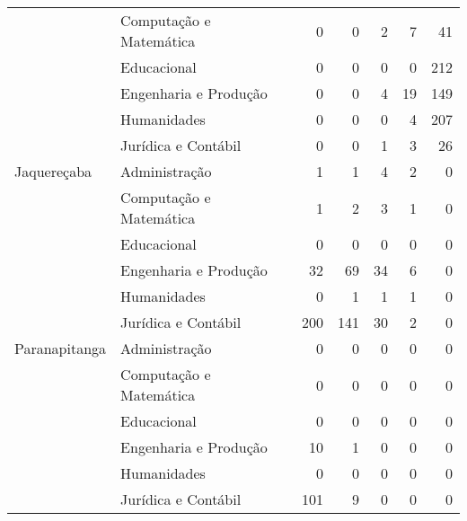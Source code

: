 \begin{table}[ht]
\begin{tabular}{ll rrrrr}
                & Computação e Matemática &                  0 &            0 &           2 &          7 &               41 \\ 
                & Educacional             &                  0 &            0 &           0 &          0 &              212 \\ 
                & Engenharia e Produção   &                  0 &            0 &           4 &         19 &              149 \\ 
                & Humanidades             &                  0 &            0 &           0 &          4 &              207 \\ 
                & Jurídica e Contábil     &                  0 &            0 &           1 &          3 &               26 \\ 
  Jaquereçaba   & Administração           &                  1 &            1 &           4 &          2 &                0 \\ 
                & Computação e Matemática &                  1 &            2 &           3 &          1 &                0 \\ 
                & Educacional             &                  0 &            0 &           0 &          0 &                0 \\ 
                & Engenharia e Produção   &                 32 &           69 &          34 &          6 &                0 \\ 
                & Humanidades             &                  0 &            1 &           1 &          1 &                0 \\ 
                & Jurídica e Contábil     &                200 &          141 &          30 &          2 &                0 \\ 
  Paranapitanga & Administração           &                  0 &            0 &           0 &          0 &                0 \\ 
                & Computação e Matemática &                  0 &            0 &           0 &          0 &                0 \\ 
                & Educacional             &                  0 &            0 &           0 &          0 &                0 \\ 
                & Engenharia e Produção   &                 10 &            1 &           0 &          0 &                0 \\ 
                & Humanidades             &                  0 &            0 &           0 &          0 &                0 \\ 
                & Jurídica e Contábil     &                101 &            9 &           0 &          0 &                0 \\ 
   \bottomrule
\end{tabular}
\end{table}

